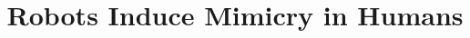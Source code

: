 \documentclass{acm_proc_article-sp}
\begin{document}
\title{Robots Induce Mimicry in Humans}
%
%
%
%
%
\end{document}
